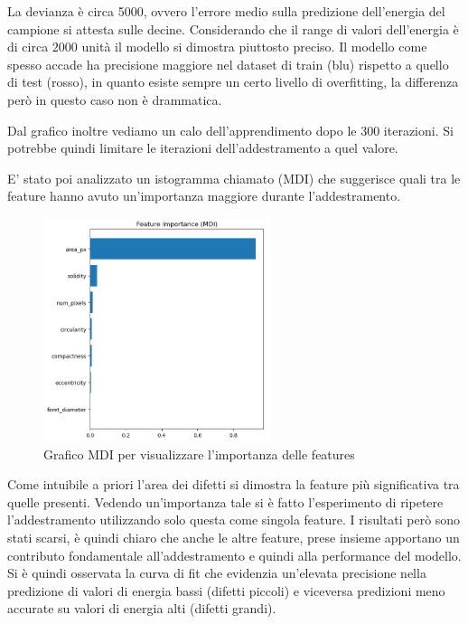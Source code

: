 \documentclass[12pt,a4paper,openright,twoside]{report}
\begin{document}
La devianza è circa 5000, ovvero l’errore medio sulla predizione dell’energia del campione si attesta sulle decine. Considerando che il range di valori dell’energia è di circa 2000 unità il modello si dimostra piuttosto preciso. 
Il modello come spesso accade ha precisione maggiore nel dataset di train (blu) rispetto a quello di test (rosso), in quanto esiste sempre un certo livello di overfitting, la differenza però in questo caso non è drammatica. 

Dal grafico inoltre vediamo un calo dell'apprendimento dopo le 300 iterazioni. Si potrebbe quindi limitare le iterazioni dell’addestramento a quel valore.


E’ stato poi analizzato un istogramma chiamato (MDI) che suggerisce quali tra le feature hanno avuto un'importanza maggiore durante l'addestramento.
\begin{center}
\begin{figure}[h]
\centering
\includegraphics[width=250px,keepaspectratio]{mdi.png}
\caption{Grafico MDI per visualizzare l'importanza delle features}
\end{figure}    
\end{center}
Come intuibile a priori l’area dei difetti si dimostra la feature più significativa tra quelle presenti. Vedendo un’importanza tale si è fatto l'esperimento di ripetere l’addestramento utilizzando solo questa come singola feature. I risultati però sono stati scarsi, è quindi chiaro che anche le altre feature, prese insieme apportano un contributo fondamentale all’addestramento e quindi alla performance del modello. 
\newpage
Si è quindi osservata la curva di fit che evidenzia un’elevata precisione nella predizione di valori di energia bassi (difetti piccoli) e viceversa predizioni meno accurate su valori di energia alti (difetti grandi).
\end{document}
